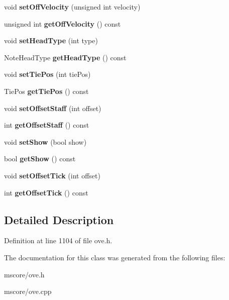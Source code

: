 \begin{DoxyCompactItemize}
\item 
\mbox{\label{class_o_v_e_1_1_note_a8d45097d4d85b054231ff01aa1f83213}} 
void {\bfseries set\+Off\+Velocity} (unsigned int velocity)
\item 
\mbox{\label{class_o_v_e_1_1_note_a1a645e2d8bdc338448acc0b5619948e1}} 
unsigned int {\bfseries get\+Off\+Velocity} () const
\item 
\mbox{\label{class_o_v_e_1_1_note_ac7943487440c07852f263c6dd7f92441}} 
void {\bfseries set\+Head\+Type} (int type)
\item 
\mbox{\label{class_o_v_e_1_1_note_a47fd1ee20fd42d051cef29fb19e658a4}} 
Note\+Head\+Type {\bfseries get\+Head\+Type} () const
\item 
\mbox{\label{class_o_v_e_1_1_note_a551a7454f010fc93fc95a0fdb36d0db5}} 
void {\bfseries set\+Tie\+Pos} (int tie\+Pos)
\item 
\mbox{\label{class_o_v_e_1_1_note_a5191b2ffa9acd7fa1fab32378b6fb8dc}} 
Tie\+Pos {\bfseries get\+Tie\+Pos} () const
\item 
\mbox{\label{class_o_v_e_1_1_note_abc4aa2fdb112d5047e2ef369d4b94dd1}} 
void {\bfseries set\+Offset\+Staff} (int offset)
\item 
\mbox{\label{class_o_v_e_1_1_note_a3805baf9660dbe0d3d2c33bf5da43d4c}} 
int {\bfseries get\+Offset\+Staff} () const
\item 
\mbox{\label{class_o_v_e_1_1_note_a2787055c80023f2768e74a6e28d8273d}} 
void {\bfseries set\+Show} (bool show)
\item 
\mbox{\label{class_o_v_e_1_1_note_a5826f799ad16c09583bb09a45b9fe76e}} 
bool {\bfseries get\+Show} () const
\item 
\mbox{\label{class_o_v_e_1_1_note_a3475fbcee5ae6713d1f145d28b1be6c4}} 
void {\bfseries set\+Offset\+Tick} (int offset)
\item 
\mbox{\label{class_o_v_e_1_1_note_a9535f780ffb9661739e8221525474083}} 
int {\bfseries get\+Offset\+Tick} () const
\end{DoxyCompactItemize}


\subsection{Detailed Description}


Definition at line 1104 of file ove.\+h.



The documentation for this class was generated from the following files\+:\begin{DoxyCompactItemize}
\item 
mscore/ove.\+h\item 
mscore/ove.\+cpp\end{DoxyCompactItemize}
